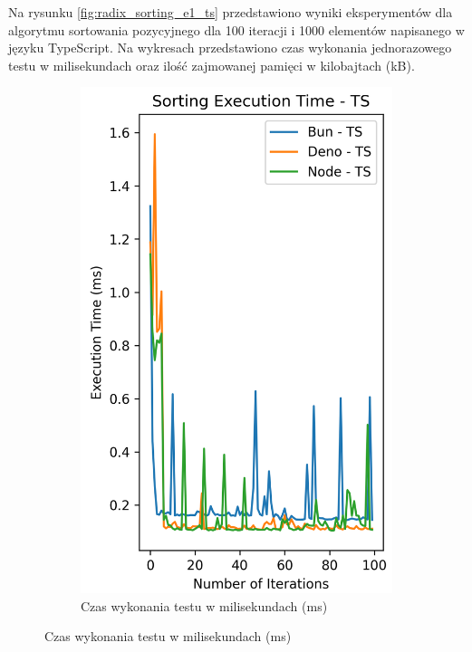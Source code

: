 Na rysunku \ref{fig:radix_sorting_e1_ts} przedstawiono wyniki eksperymentów dla algorytmu sortowania pozycyjnego dla 100 iteracji i 1000 elementów napisanego w języku TypeScript. Na wykresach przedstawiono czas wykonania jednorazowego testu w milisekundach oraz ilość zajmowanej pamięci w kilobajtach (kB).

\begin{figure}[H]
  \centering
  \begin{subfigure}[b]{0.44\textwidth}
    \centering
    \includegraphics[width=\textwidth]{Figures/sorting/sorting_radix_100_1000_ts_time.png}
    \caption{Czas wykonania testu w milisekundach (ms)}
    \label{fig:radix_sorting_e1_ts_time}

\end{subfigure}
\end{figure}
